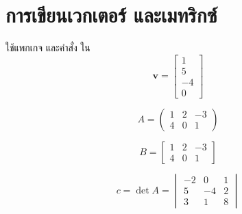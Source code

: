 \documentclass[12pt,a4paper]{article} %
\begin{document}
\section{การเขียนเวกเตอร์ และเมทริกซ์}
ใช้แพกเกจ  และคำสั่ง  ใน 
\begin{equation}
{\mathbf v} = \begin{bmatrix}1 \\ 5 \\ -4 \\ 0\end{bmatrix}
\end{equation}

\begin{equation}
A = \begin{pmatrix}1 & 2 & -3 \\ 4 & 0 & 1\end{pmatrix}
\end{equation}

\begin{equation}
B = \begin{bmatrix}1 & 2 & -3 \\ 4 & 0 & 1\end{bmatrix}
\end{equation}

\begin{equation}
c = \det A = \begin{vmatrix}-2 & 0 & 1 \\ 5 & -4 & 2 \\ 3 & 1 & 8\end{vmatrix}
\end{equation}
\end{document}
